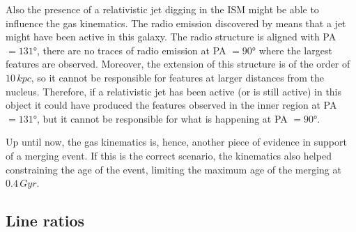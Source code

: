 \documentclass[../main.tex]{subfiles}
\begin{document}
Also the presence of a relativistic jet digging in the ISM might be able to influence the gas kinematics.
The radio emission discovered by \citet{Congiu17} means that a jet might have been active in this galaxy.
The radio structure is aligned with PA $=\ang{131}$, there are no traces of radio emission at PA $=\ang{90}$ where the largest features are observed.
Moreover, the extension of this structure is of the order of $10\,\si{kpc}$, so it cannot be responsible for features at larger distances from the nucleus.
Therefore, if a relativistic jet has been active (or is still active) in this object it could have produced the features observed in the inner region at PA $=\ang{131}$, but it cannot be responsible for what is happening at PA $=\ang{90}$.

Up until now, the gas kinematics is, hence, another piece of evidence in support of a merging event.
If this is the correct scenario, the kinematics also helped constraining the age of the event, limiting the maximum age of the merging at $0.4\,\si{Gyr}$.


\subsection{Line ratios}
\label{sec:pap3_lineratios}
\end{document}

